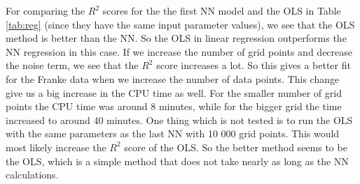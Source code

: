 \documentclass[12pt,a4paper,english]{article}
\begin{document}
For comparing the $R^2$ scores for the the first NN model and the OLS in Table \ref{tab:reg} (since they have the same input parameter values), we see that the OLS method is better than the NN. So the OLS in linear regression outperforms the NN regression in this case. If we increase the number of grid points and decrease the noise term, we see that the $R^2$ score increases a lot. So this gives a better fit for the Franke data when we increase the number of data points. This change give us a big increase in the CPU time as well. For the smaller number of grid points the CPU time was around 8 minutes, while for the bigger grid the time increased to around 40 minutes. One thing which is not tested is to run the OLS with the same parameters as the last NN with 10 000 grid points. This would most likely increase the $R^2$ score of the OLS. So the better method seems to be the OLS, which is a simple method that does not take nearly as long as the NN calculations.
\end{document}
